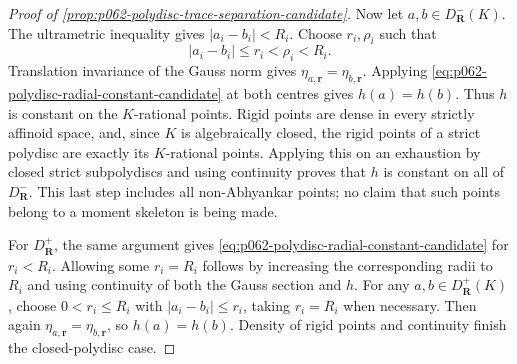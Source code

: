 \begin{proof}[Proof of \cref{prop:p062-polydisc-trace-separation-candidate}]
Now let \(a,b\in D^-_{\mathbf R}(K)\). The ultrametric inequality gives
\(|a_i-b_i|<R_i\). Choose \(r_i,\rho_i\) such that
\[
             |a_i-b_i|\leq r_i<\rho_i<R_i.
\]
Translation invariance of the Gauss norm gives
\(\eta_{a,\mathbf r}=\eta_{b,\mathbf r}\). Applying
\eqref{eq:p062-polydisc-radial-constant-candidate} at both centres gives
\(h(a)=h(b)\). Thus \(h\) is constant on the \(K\)-rational points.
Rigid points are dense in every strictly affinoid space, and, since \(K\)
is algebraically closed, the rigid points of a strict polydisc are exactly
its \(K\)-rational points. Applying this on an exhaustion by closed strict
subpolydiscs and using continuity proves that \(h\) is constant on all of
\(D^-_{\mathbf R}\). This last step includes all non-Abhyankar points; no
claim that such points belong to a moment skeleton is being made.

For \(D^+_{\mathbf R}\), the same argument gives
\eqref{eq:p062-polydisc-radial-constant-candidate} for \(r_i<R_i\).
Allowing some \(r_i=R_i\) follows by increasing the corresponding radii
to \(R_i\) and using continuity of both the Gauss section and \(h\). For
any \(a,b\in D^+_{\mathbf R}(K)\), choose
\(0<r_i\leq R_i\) with \(|a_i-b_i|\leq r_i\), taking \(r_i=R_i\) when
necessary. Then again
\(\eta_{a,\mathbf r}=\eta_{b,\mathbf r}\), so \(h(a)=h(b)\). Density of
rigid points and continuity finish the closed-polydisc case.
\end{proof}

